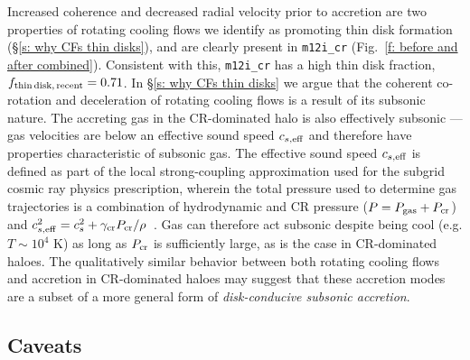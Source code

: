 \documentclass[fleqn,usenatbib]{mnras}
\newcommand{\fthin}{f_{\rm thin\,disk,\,recent}}
\begin{document}
Increased coherence and decreased radial velocity prior to accretion are two properties of rotating cooling flows we identify as promoting thin disk formation (\S\ref{s: why CFs thin disks}), and are clearly present in \texttt{m12i\_cr} (Fig.~\ref{f: before and after combined}).
Consistent with this, \texttt{m12i\_cr} has a high thin disk fraction, $\fthin=0.71$.
In \S\ref{s: why CFs thin disks} we argue that the coherent co-rotation and deceleration of rotating cooling flows is a result of its subsonic nature.
The accreting gas in the CR-dominated halo is also effectively subsonic --- gas velocities are below an effective sound speed $c_{s,{\rm eff}}$ and therefore have properties characteristic of subsonic gas.
The effective sound speed $c_{s,{\rm eff}}$ is defined as part of the local strong-coupling approximation used for the subgrid cosmic ray physics prescription, wherein the total pressure used to determine gas trajectories is a combination of hydrodynamic and CR pressure ($P = P_{\rm gas} + P_{\rm cr}$) and $c^2_{s,{\rm eff}}=c^2_{s}+\gamma_{\rm cr} P_{\rm cr}/\rho$~\citep{Hopkins2020a}.
Gas can therefore act subsonic despite being cool (e.g. $T\sim10^4$ K) as long as $P_{\rm cr}$ is sufficiently large, as is the case in CR-dominated haloes.
The qualitatively similar behavior between both rotating cooling flows and accretion in CR-dominated haloes may suggest that these accretion modes are a subset of a more general form of \textit{disk-conducive subsonic accretion}.

\subsection{Caveats}
\label{s: caveats}
\end{document}
